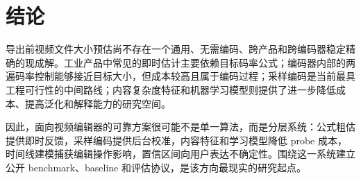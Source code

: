 \documentclass[UTF8,a4paper,11pt]{ctexart}
\begin{document}
\section{结论}

导出前视频文件大小预估尚不存在一个通用、无需编码、跨产品和跨编码器稳定精确的现成解。工业产品中常见的即时估计主要依赖目标码率公式；编码器内部的两遍码率控制能够接近目标大小，但成本较高且属于编码过程；采样编码是当前最具工程可行性的中间路线；内容复杂度特征和机器学习模型则提供了进一步降低成本、提高泛化和解释能力的研究空间。

因此，面向视频编辑器的可靠方案很可能不是单一算法，而是分层系统：公式粗估提供即时反馈，采样编码提供后台校准，内容特征和学习模型降低 probe 成本，时间线建模捕获编辑操作影响，置信区间向用户表达不确定性。围绕这一系统建立公开 benchmark、baseline 和评估协议，是该方向最现实的研究起点。
\end{document}
